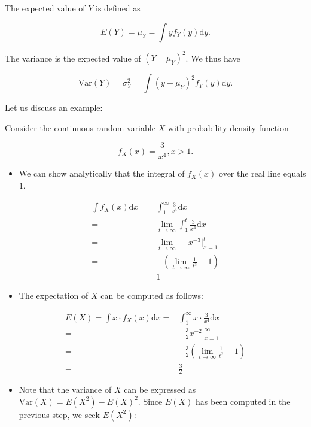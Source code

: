 \documentclass[]{book}
\providecommand{\tightlist}{%
  \setlength{\itemsep}{0pt}\setlength{\parskip}{0pt}}
\theoremstyle{definition}
\theoremstyle{definition}
\theoremstyle{definition}
\theoremstyle{remark}
\begin{document}
The expected value of \(Y\) is defined as

\[ E(Y) =  \mu_Y = \int y f_Y(y) \mathrm{d}y. \]

The variance is the expected value of \((Y - \mu_Y)^2\). We thus have

\[ \text{Var}(Y) =  \sigma_Y^2 = \int (y - \mu_Y)^2 f_Y(y) \mathrm{d}y. \]

Let us discuss an example:

Consider the continuous random variable \(X\) with probability density
function

\[ f_X(x) = \frac{3}{x^4}, x>1. \]

\begin{itemize}
\tightlist
\item
  We can show analytically that the integral of \(f_X(x)\) over the real
  line equals \(1\).
\end{itemize}

\begin{align}
 \int f_X(x) \mathrm{d}x =&  \int_{1}^{\infty} \frac{3}{x^4} \mathrm{d}x \\
  =& \lim_{t \rightarrow \infty} \int_{1}^{t} \frac{3}{x^4} \mathrm{d}x \\
  =& \lim_{t \rightarrow \infty}  -x^{-3} \rvert_{x=1}^t \\
  =& -\left(\lim_{t \rightarrow \infty}\frac{1}{t^3} - 1\right) \\
  =& 1
\end{align}

\begin{itemize}
\tightlist
\item
  The expectation of \(X\) can be computed as follows:
\end{itemize}

\begin{align}
 E(X) = \int x \cdot f_X(x) \mathrm{d}x =&  \int_{1}^{\infty} x \cdot \frac{3}{x^4} \mathrm{d}x \\
  =& - \frac{3}{2} x^{-2} \rvert_{x=1}^{\infty} \\
  =& -\frac{3}{2} \left( \lim_{t \rightarrow \infty} \frac{1}{t^2} - 1 \right) \\
  =& \frac{3}{2}
\end{align}

\begin{itemize}
\tightlist
\item
  Note that the variance of \(X\) can be expressed as
  \(\text{Var}(X) = E(X^2) - E(X)^2\). Since \(E(X)\) has been computed
  in the previous step, we seek \(E(X^2)\):
\end{itemize}
\end{document}
